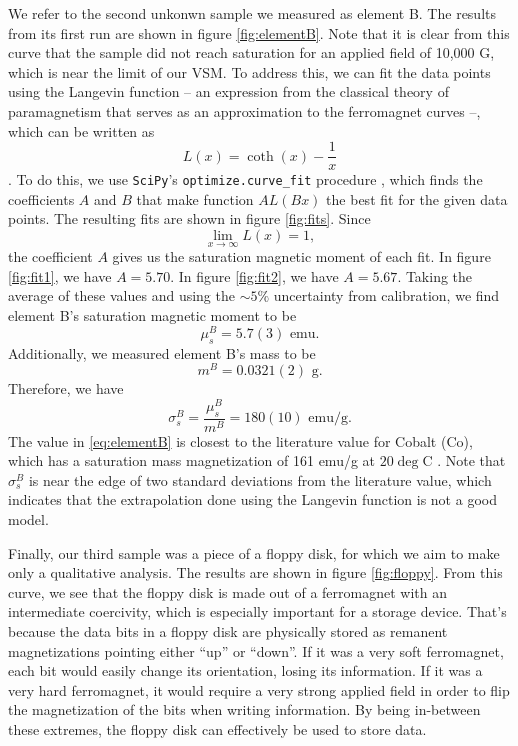 \documentclass{../paper}
\begin{document}
We refer to the second unkonwn sample we measured as element B. The results from its first run are shown in figure \ref{fig:elementB}. Note that it is clear from this curve that the sample did not reach saturation for an applied field of 10,000 G, which is near the limit of our VSM. To address this, we can fit the data points using the Langevin function -- an expression from the classical theory of paramagnetism that serves as an approximation to the ferromagnet curves \cite{LabManual} --, which can be written as
\begin{equation}
  L(x) = \coth(x) - \frac{1}{x}
\end{equation}
\cite{CullityGraham}. To do this, we use {\tt SciPy}'s {\tt optimize.curve\_fit} procedure \cite{SciPy}, which finds the coefficients $A$ and $B$ that make function $A L(B x)$ the best fit for the given data points. The resulting fits are shown in figure \ref{fig:fits}. Since
\begin{equation}
  \lim_{x \to \infty} L(x) = 1,
\end{equation}
the coefficient $A$ gives us the saturation magnetic moment of each fit. In figure \ref{fig:fit1}, we have $A=5.70$. In figure \ref{fig:fit2}, we have $A=5.67$. Taking the average of these values and using the $\sim 5\%$ uncertainty from calibration, we find element B's saturation magnetic moment to be
\begin{equation}
  \mu_s^B = 5.7(3) \text{ emu}.
\end{equation}
Additionally, we measured element B's mass to be
\begin{equation}
  m^B = 0.0321(2) \text{ g}.
\end{equation}
Therefore, we have
\begin{equation}\label{eq:elementB}
  \sigma_s^B = \frac{\mu_s^B}{m^B} = 180(10) \text{ emu/g}.
\end{equation}
The value in \eqref{eq:elementB} is closest to the literature value for Cobalt (Co), which has a saturation mass magnetization of 161 emu/g at $20\deg$C \cite{CRCHandbook}. Note that $\sigma_s^B$ is near the edge of two standard deviations from the literature value, which indicates that the extrapolation done using the Langevin function is not a good model.

Finally, our third sample was a piece of a floppy disk, for which we aim to make only a qualitative analysis. The results are shown in figure \ref{fig:floppy}. From this curve, we see that the floppy disk is made out of a ferromagnet with an intermediate coercivity, which is especially important for a storage device. That's because the data bits in a floppy disk are physically stored as remanent magnetizations pointing either ``up'' or ``down''. If it was a very soft ferromagnet, each bit would easily change its orientation, losing its information. If it was a very hard ferromagnet, it would require a very strong applied field in order to flip the magnetization of the bits when writing information. By being in-between these extremes, the floppy disk can effectively be used to store data.
\end{document}
